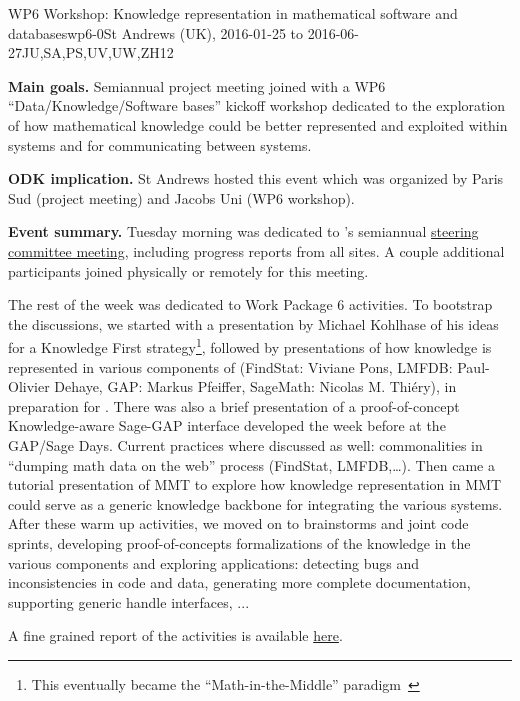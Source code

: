 \begin{event}{WP6 Workshop: Knowledge representation in mathematical software and databases}{wp6-0}{St Andrews (UK), 2016-01-25 to 2016-06-27}{JU,SA,PS,UV,UW,ZH}{12}{}

  \textbf{Main goals.} Semiannual \ODK project meeting joined with a WP6
  ``Data/Knowledge/Software bases'' kickoff workshop dedicated to the exploration of how
  mathematical knowledge could be better represented and exploited within systems and for
  communicating between systems.

  \textbf{ODK implication.} St Andrews hosted this event which was organized by Paris Sud
  (project meeting) and Jacobs Uni (WP6 workshop).

  \textbf{Event summary.} Tuesday morning was dedicated to \ODK's semiannual
  \href{http://opendreamkit.org/meetings/2016-01-25-DKS/SteeringCommittee/minutes/}
  {steering committee meeting}, including progress reports from all sites. A couple
  additional \ODK participants joined physically or remotely for this meeting.

  The rest of the week was dedicated to Work Package 6 activities. To bootstrap the
  discussions, we started with a presentation by Michael Kohlhase of his ideas for a
  Knowledge First strategy\footnote{This eventually became the ``Math-in-the-Middle''
    paradigm~\cite{DehKohKon:iop16}}, followed by presentations of how knowledge is
  represented in various components of \ODK (FindStat: Viviane Pons, LMFDB: Paul-Olivier
  Dehaye, GAP: Markus Pfeiffer, SageMath: Nicolas M. Thiéry), in preparation for
  . There was also a brief presentation of a
  proof-of-concept Knowledge-aware Sage-GAP interface developed the week before at the
  GAP/Sage Days. Current practices where discussed as well: commonalities in ``dumping
  math data on the web'' process (FindStat, LMFDB,…). Then came a tutorial presentation of
  MMT to explore how knowledge representation in MMT could serve as a generic knowledge
  backbone for integrating the various systems.  After these warm up activities, we moved
  on to brainstorms and joint code sprints, developing proof-of-concepts formalizations of
  the knowledge in the various components and exploring applications: detecting bugs and
  inconsistencies in code and data, generating more complete documentation, supporting
  generic handle interfaces, ...

A fine grained report of the activities is available
\href{http://opendreamkit.org/meetings/2016-01-25-DKS/report/}{here}.


\end{event}
